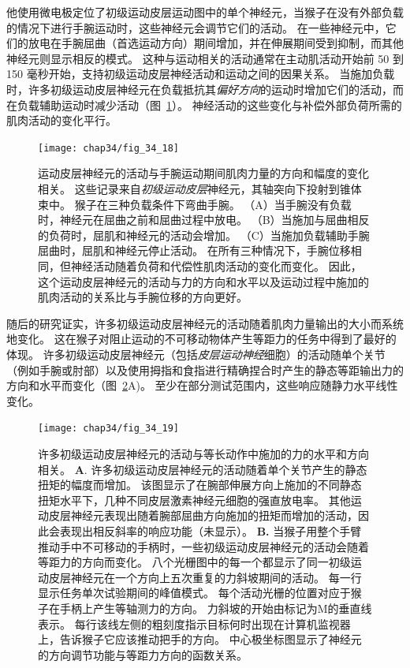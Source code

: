 他使用微电极定位了初级运动皮层运动图中的单个神经元，当猴子在没有外部负载的情况下进行手腕运动时，这些神经元会调节它们的活动。
在一些神经元中，它们的放电在手腕屈曲（首选运动方向）期间增加，并在伸展期间受到抑制，而其他神经元则显示相反的模式。
这种与运动相关的活动通常在主动肌活动开始前 50 到 150 毫秒开始，支持初级运动皮层神经活动和运动之间的因果关系。
当施加负载时，许多初级运动皮层神经元在负载抵抗其\textit{偏好方向}的运动时增加它们的活动，而在负载辅助运动时减少活动（图~\ref{fig:34_18}）。
神经活动的这些变化与补偿外部负荷所需的肌肉活动的变化平行。


\begin{figure}[htbp]
	\centering
	\texttt{[image: chap34/fig\_34\_18]}
	\caption{运动皮层神经元的活动与手腕运动期间肌肉力量的方向和幅度的变化相关。
		这些记录来自\textit{初级运动皮层}神经元，其轴突向下投射到锥体束中。
		猴子在三种负载条件下弯曲手腕。
		（A）当手腕没有负载时，神经元在屈曲之前和屈曲过程中放电。
		（B）当施加与屈曲相反的负荷时，屈肌和神经元的活动会增加。
		（C）当施加负载辅助手腕屈曲时，屈肌和神经元停止活动。
		在所有三种情况下，手腕位移相同，但神经活动随着负荷和代偿性肌肉活动的变化而变化。
		因此，这个运动皮层神经元的活动与力的方向和水平以及运动过程中施加的肌肉活动的关系比与手腕位移的方向更好\cite{evarts1968relation}。}
	\label{fig:34_18}
\end{figure}


随后的研究证实，许多初级运动皮层神经元的活动随着肌肉力量输出的大小而系统地变化。
这在猴子对阻止运动的不可移动物体产生等距力的任务中得到了最好的体现。
许多初级运动皮层神经元（包括\textit{皮层运动神经}细胞）的活动随单个关节（例如手腕或肘部）以及使用拇指和食指进行精确捏合时产生的静态等距输出力的方向和水平而变化（图~\ref{fig:34_19}A)。
至少在部分测试范围内，这些响应随静力水平线性变化。


\begin{figure}[htbp]
	\centering
	\texttt{[image: chap34/fig\_34\_19]}
	\caption{许多初级运动皮层神经元的活动与等长动作中施加的力的水平和方向相关。
		\textbf{A}. 许多初级运动皮层神经元的活动随着单个关节产生的静态扭矩的幅度而增加。
		该图显示了在腕部伸展方向上施加的不同静态扭矩水平下，几种不同皮层激素神经元细胞的强直放电率。
		其他运动皮层神经元表现出随着腕部屈曲方向施加的扭矩而增加的活动，因此会表现出相反斜率的响应功能（未显示）\cite{fetz1980postspike}。
		\textbf{B.} 当猴子用整个手臂推动手中不可移动的手柄时，一些初级运动皮层神经元的活动会随着等距力的方向而变化。
		八个光栅图中的每一个都显示了同一初级运动皮层神经元在一个方向上五次重复的力斜坡期间的活动。
		每一行显示任务单次试验期间的峰值模式。
		每个活动光栅的位置对应于猴子在手柄上产生等轴测力的方向。
		力斜坡的开始由标记为M的垂直线表示。
		每行该线左侧的粗刻度指示目标何时出现在计算机监视器上，告诉猴子它应该推动把手的方向。
		中心极坐标图显示了神经元的方向调节功能与等距力方向的函数关系\cite{sergio2003systematic}。}
	\label{fig:34_19}
\end{figure}



